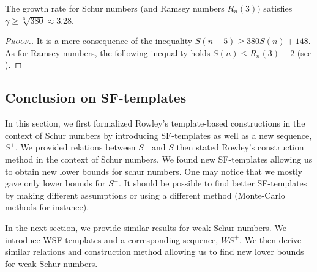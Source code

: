 \begin{corollary}
The growth rate for Schur numbers (and Ramsey numbers \(R_n(3)\))  satisfies \(\gamma \geqslant \sqrt[5]{380} \approx 3.28\).
\end{corollary}

\begin{proof}[\textsc{Proof.}]
It is a mere consequence of the inequality \( S(n+5) \geqslant 380S(n) + 148\). As for Ramsey
numbers, the following inequality holds \(S(n) \leqslant R_n(3) - 2\) (see \cite{AbbottHanson}).
\end{proof}


\subsection{Conclusion on SF-templates}

\qquad In this section, we first formalized Rowley's template-based constructions \cite{RowleyRamsey} in the context of Schur numbers 
by introducing SF-templates as well as a new sequence, \(S^+\). We provided relations between \(S^+\) and \(S\) then 
stated Rowley's construction method in the context of Schur numbers. We found new SF-templates allowing us to obtain 
new lower bounds for schur numbers. One may notice that we mostly gave only lower bounds for \(S^+\). It should be possible to 
find better SF-templates by making different assumptions or using a different method (Monte-Carlo methods for instance).

\par
In the next section, we provide similar results for weak Schur numbers. We introduce WSF-templates and a corresponding sequence, 
\(WS^+\). We then derive similar relations and construction method allowing us to find new lower bounds for weak Schur numbers.

